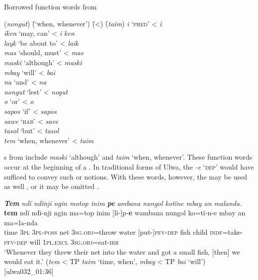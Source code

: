 \ea%
    \label{ex:loss:10a}
     Borrowed function words from 
\begin{tabbing}
{(\textit{nongut})} \= {(‘when, whenever’)} \= {(<)} \= {(\textit{taim})}\kill
{\textit{i}} \> {‘\textsc{pred}’} \> {<} \> {\textit{i}}\\
{\textit{iken}} \> {‘may, can’} \> {<} \> {\textit{i ken}}\\
{\textit{layk}} \> {‘be about to’} \> {<} \> {\textit{laik}}\\
{\textit{mas}} \> {‘should, must’} \> {<} \> {\textit{mas}}\\
{\textit{maski}} \> {‘although’} \> {<} \> {\textit{maski}}\\
{\textit{mbay}} \> {‘will’} \> {<} \> {\textit{bai}}\\
{\textit{na}} \> {‘and’} \> {<} \> {\textit{na}}\\
{\textit{nongut}} \> {‘lest’} \> {<} \> {\textit{nogut}}\\
{\textit{o}} \> {‘or’} \> {<} \> {\textit{o}}\\
{\textit{sapos}} \> {‘if’} \> {<} \> {\textit{sapos}}\\
{\textit{sawe}} \> {‘\textsc{hab}’} \> {<} \> {\textit{save}}\\
{\textit{tasol}} \> {‘but’} \> {<} \> {\textit{tasol}}\\
{\textit{tem}} \> {‘when, whenever’} \> {<} \> {\textit{taim}}
\end{tabbing}
\z



 s from  include \textit{maski} ‘although’ and \textit{taim} ‘when, whenever’. These function words occur at the beginning of a . In traditional forms of Ulwa, the  \textit{-e} ‘\textsc{dep}’ would have sufficed to convey such  or  notions. With these words, however, the  may be used as well , or it may be omitted .

\ea%
    \label{ex:loss:13}
          \textit{\textbf{Tem} ndï ndïnji ngin motop inim \textbf{pe} ambana nungol kotïne mbay an malanda.}\\
\gll    \textbf{tem}  ndï  ndï-nji    ngin  ma=top      inim  [lï-]p-\textbf{e}     wambana  nungol  ko=tï-n-e        mbay  an ma=la-nda\\
    time  \textsc{3pl}  3\textsc{pl-poss}  net    \textsc{3sg.obj}=throw  water  [put-]\textsc{pfv-dep}    fish    child  \textsc{indf}=take-\textsc{pfv-dep}  will  1\textsc{pl.excl}    \textsc{3sg.obj}=eat-\textsc{irr}\\
\glt `Whenever they threw their net into the water and got a small fish, [then] we would eat it.’ (\textit{tem} < TP \textit{taim} ‘time, when’, \textit{mbay} < TP \textit{bai} ‘will’) [ulwa032\_01:36]
\z

